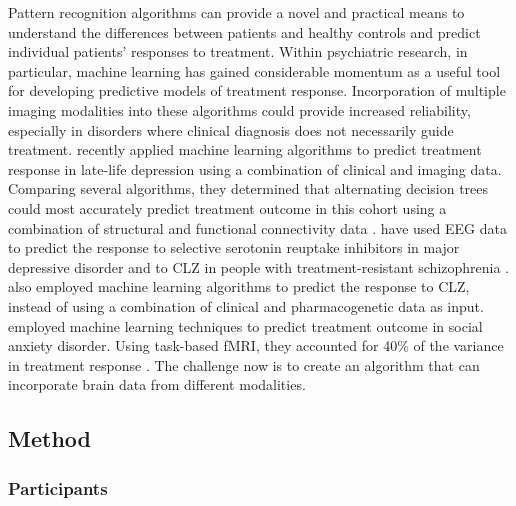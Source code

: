 Pattern recognition algorithms can provide a novel and practical means to understand the differences between patients and healthy controls and predict individual patients' responses to treatment. Within psychiatric research, in particular, machine learning has gained considerable momentum as a useful tool for developing predictive models of treatment response. Incorporation of multiple imaging modalities into these algorithms could provide increased reliability, especially in disorders where clinical diagnosis does not necessarily guide treatment. \citet{patel2015machine} recently applied machine learning algorithms to predict treatment response in late-life depression using a combination of clinical and imaging data. Comparing several algorithms, they determined that alternating decision trees could most accurately predict treatment outcome in this cohort using a combination of structural and functional connectivity data \citep{patel2015machine}. \citet{khodayari2013machine} have used EEG data to predict the response to selective serotonin reuptake inhibitors in major depressive disorder and to CLZ in people with treatment-resistant schizophrenia \citep{khodayari2010pilot}. \citet{lin2008artificial} also employed machine learning algorithms to predict the response to CLZ, instead of using a combination of clinical and pharmacogenetic data as input. \citet{doehrmann2013predicting} employed machine learning techniques to predict treatment outcome in social anxiety disorder. Using task-based fMRI, they accounted for 40\% of the variance in treatment response \citep{doehrmann2013predicting}. The challenge now is to create an algorithm that can incorporate brain data from different modalities.

\subsection{Method}

\label{subsec:schizophrenia_method}

\subsubsection{Participants}

